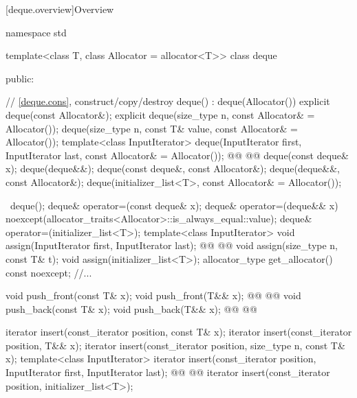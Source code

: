 \documentclass{wg21}
\begin{document}
[deque.overview]{Overview}
\begin{codeblock}
namespace std {
    template<class T, class Allocator = allocator<T>>
    class deque {
        public:

        // \ref{deque.cons}, construct/copy/destroy
        deque() : deque(Allocator()) { }
        explicit deque(const Allocator&);
        explicit deque(size_type n, const Allocator& = Allocator());
        deque(size_type n, const T& value, const Allocator& = Allocator());
        template<class InputIterator>
        deque(InputIterator first, InputIterator last, const Allocator& = Allocator());
        @@
        @@
        deque(const deque& x);
        deque(deque&&);
        deque(const deque&, const Allocator&);
        deque(deque&&, const Allocator&);
        deque(initializer_list<T>, const Allocator& = Allocator());

        ~deque();
        deque& operator=(const deque& x);
        deque& operator=(deque&& x)
        noexcept(allocator_traits<Allocator>::is_always_equal::value);
        deque& operator=(initializer_list<T>);
        template<class InputIterator>
        void assign(InputIterator first, InputIterator last);
        @@
        @@
        void assign(size_type n, const T& t);
        void assign(initializer_list<T>);
        allocator_type get_allocator() const noexcept;
        //...

        void push_front(const T& x);
        void push_front(T&& x);
        @@
        @@
        void push_back(const T& x);
        void push_back(T&& x);
        @@
        @@


        iterator insert(const_iterator position, const T& x);
        iterator insert(const_iterator position, T&& x);
        iterator insert(const_iterator position, size_type n, const T& x);
        template<class InputIterator>
        iterator insert(const_iterator position, InputIterator first, InputIterator last);
        @@
        @@
        iterator insert(const_iterator position, initializer_list<T>);

}}
\end{codeblock}
\end{document}
